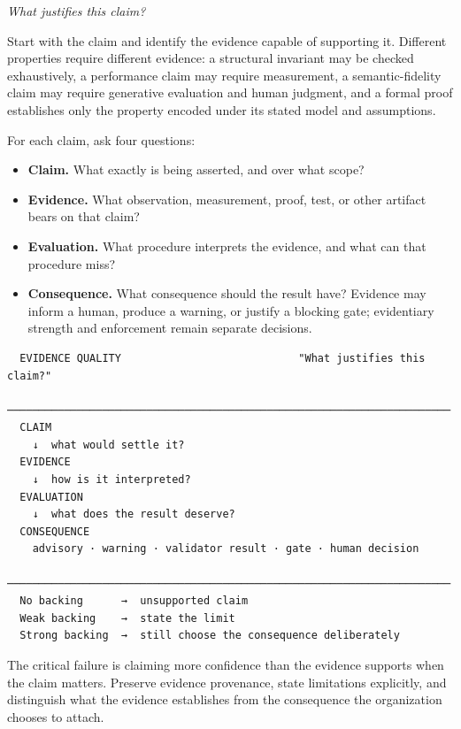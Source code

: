 

\emph{What justifies this claim?}

Start with the claim and identify the evidence capable of supporting it. Different properties require different evidence: a structural invariant may be checked exhaustively, a performance claim may require measurement, a semantic-fidelity claim may require generative evaluation and human judgment, and a formal proof establishes only the property encoded under its stated model and assumptions.

For each claim, ask four questions:

\begin{itemize}
\tightlist
\item
  \textbf{Claim.} What exactly is being asserted, and over what scope?
\item
  \textbf{Evidence.} What observation, measurement, proof, test, or other artifact bears on that claim?
\item
  \textbf{Evaluation.} What procedure interprets the evidence, and what can that procedure miss?
\item
  \textbf{Consequence.} What consequence should the result have? Evidence may inform a human, produce a warning, or justify a blocking gate; evidentiary strength and enforcement remain separate decisions.
\end{itemize}

\begin{verbatim}
  EVIDENCE QUALITY                            "What justifies this claim?"
  ──────────────────────────────────────────────────────────────────────
  CLAIM
    ↓  what would settle it?
  EVIDENCE
    ↓  how is it interpreted?
  EVALUATION
    ↓  what does the result deserve?
  CONSEQUENCE
    advisory · warning · validator result · gate · human decision
  ──────────────────────────────────────────────────────────────────────
  No backing      →  unsupported claim
  Weak backing    →  state the limit
  Strong backing  →  still choose the consequence deliberately
\end{verbatim}

The critical failure is claiming more confidence than the evidence supports when the claim matters. Preserve evidence provenance, state limitations explicitly, and distinguish what the evidence establishes from the consequence the organization chooses to attach.
